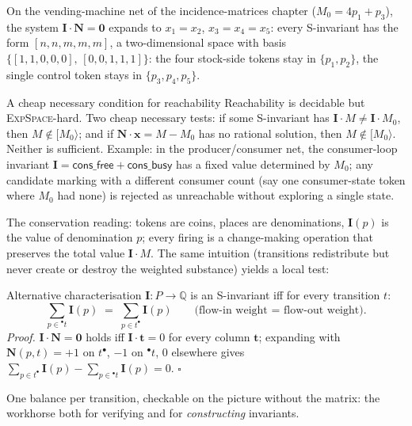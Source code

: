 On the vending-machine net of the incidence-matrices chapter ($M_0 = 4p_1 + p_3$), the system $\mathbf{I} \cdot \mathbf{N} = \mathbf{0}$ expands to $x_1 = x_2$, $x_3 = x_4 = x_5$: every S-invariant has the form $[n, n, m, m, m]$, a two-dimensional space with basis $\{[1,1,0,0,0],\, [0,0,1,1,1]\}$: the four stock-side tokens stay in $\{p_1, p_2\}$, the single control token stays in $\{p_3, p_4, p_5\}$.

\begin{notebox}{A cheap necessary condition for reachability}
Reachability is decidable but \textsc{ExpSpace}-hard. Two cheap necessary tests: if some S-invariant has $\mathbf{I} \cdot M \neq \mathbf{I} \cdot M_0$, then $M \notin [M_0\rangle$; and if $\mathbf{N} \cdot \mathbf{x} = M - M_0$ has no rational solution, then $M \notin [M_0\rangle$. Neither is sufficient. Example: in the producer/consumer net, the consumer-loop invariant $\mathbf{I} = \textsf{cons\_free} + \textsf{cons\_busy}$ has a fixed value determined by $M_0$; any candidate marking with a different consumer count (say one consumer-state token where $M_0$ had none) is rejected as unreachable without exploring a single state.
\end{notebox}

The conservation reading: tokens are coins, places are denominations, $\mathbf{I}(p)$ is the value of denomination $p$; every firing is a change-making operation that preserves the total value $\mathbf{I} \cdot M$. The same intuition (transitions redistribute but never create or destroy the weighted substance) yields a local test:

\begin{notebox}{Alternative characterisation}
$\mathbf{I} : P \to \mathbb{Q}$ is an S-invariant iff for every transition $t$:
\[
  \sum_{p \in {}^\bullet t} \mathbf{I}(p) \;=\; \sum_{p \in t^\bullet} \mathbf{I}(p)
  \qquad \text{(flow-in weight = flow-out weight)}.
\]
\textit{Proof.} $\mathbf{I} \cdot \mathbf{N} = \mathbf{0}$ holds iff $\mathbf{I} \cdot \mathbf{t} = 0$ for every column $\mathbf{t}$; expanding with $\mathbf{N}(p,t) = +1$ on $t^\bullet$, $-1$ on ${}^\bullet t$, $0$ elsewhere gives $\sum_{p \in t^\bullet} \mathbf{I}(p) - \sum_{p \in {}^\bullet t} \mathbf{I}(p) = 0$. \hfill$\square$
\par\smallskip
One balance per transition, checkable on the picture without the matrix: the workhorse both for verifying and for \emph{constructing} invariants.
\end{notebox}

